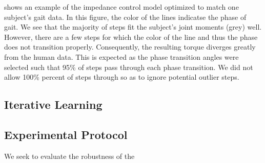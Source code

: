  shows an example of the impedance control model
optimized to match one subject's gait data. In this figure, the color of the
lines indicatse the phase of gait. We see that the majority of steps fit the
subject's joint moments (grey) well. However, there are a few steps for which
the color of the line and thus the phase does not transition properly.
Consequently, the resulting torque diverges greatly from the human data. This is
expected as the phase transition angles were selected such that 95\% of steps
pass through each phase transition. We did not allow 100\% percent of steps
through so as to ignore potential outlier steps.

\subsection{Iterative Learning}

\subsection{Experimental Protocol}

We seek to evaluate the robustness of the
